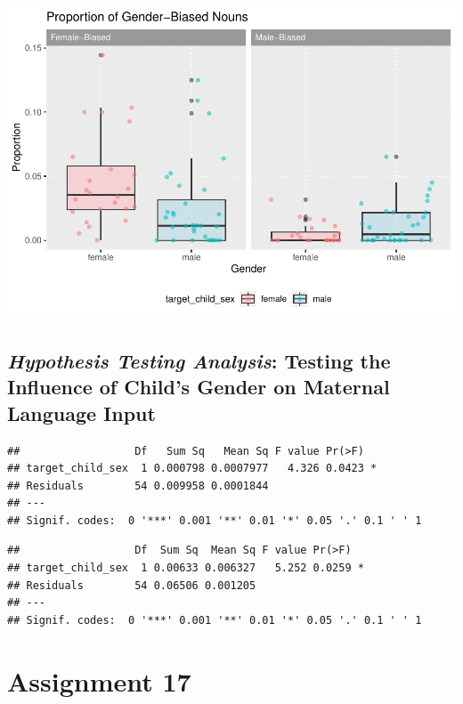 \documentclass[
  man]{apa6}
\begin{document}
\includegraphics{My-Notebook_files/figure-latex/descriptive-analysis-1.pdf}

\hypertarget{hypothesis-testing-analysis-testing-the-influence-of-childs-gender-on-maternal-language-input}{%
\subsection{\texorpdfstring{\emph{Hypothesis Testing Analysis}: Testing the Influence of Child's Gender on Maternal Language Input}{Hypothesis Testing Analysis: Testing the Influence of Child's Gender on Maternal Language Input}}\label{hypothesis-testing-analysis-testing-the-influence-of-childs-gender-on-maternal-language-input}}

\begin{verbatim}
##                  Df   Sum Sq   Mean Sq F value Pr(>F)  
## target_child_sex  1 0.000798 0.0007977   4.326 0.0423 *
## Residuals        54 0.009958 0.0001844                 
## ---
## Signif. codes:  0 '***' 0.001 '**' 0.01 '*' 0.05 '.' 0.1 ' ' 1
\end{verbatim}

\begin{verbatim}
##                  Df  Sum Sq  Mean Sq F value Pr(>F)  
## target_child_sex  1 0.00633 0.006327   5.252 0.0259 *
## Residuals        54 0.06506 0.001205                 
## ---
## Signif. codes:  0 '***' 0.001 '**' 0.01 '*' 0.05 '.' 0.1 ' ' 1
\end{verbatim}

\hypertarget{assignment-17}{%
\section{Assignment 17}\label{assignment-17}}
\end{document}
